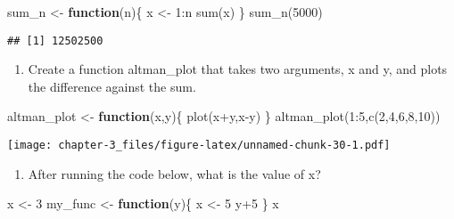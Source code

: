 \documentclass[
]{article}
\newenvironment{Shaded}{\begin{snugshade}}{\end{snugshade}}
\newcommand{\ControlFlowTok}[1]{\textcolor[rgb]{0.13,0.29,0.53}{\textbf{#1}}}
\newcommand{\DecValTok}[1]{\textcolor[rgb]{0.00,0.00,0.81}{#1}}
\newcommand{\FunctionTok}[1]{\textcolor[rgb]{0.00,0.00,0.00}{#1}}
\newcommand{\NormalTok}[1]{#1}
\newcommand{\OtherTok}[1]{\textcolor[rgb]{0.56,0.35,0.01}{#1}}
\newcommand{\SpecialCharTok}[1]{\textcolor[rgb]{0.00,0.00,0.00}{#1}}
\providecommand{\tightlist}{%
  \setlength{\itemsep}{0pt}\setlength{\parskip}{0pt}}
\begin{document}
\begin{Shaded}
\begin{Highlighting}[]
\NormalTok{sum\_n }\OtherTok{\textless{}{-}} \ControlFlowTok{function}\NormalTok{(n)\{}
\NormalTok{  x }\OtherTok{\textless{}{-}} \DecValTok{1}\SpecialCharTok{:}\NormalTok{n}
  \FunctionTok{sum}\NormalTok{(x)}
\NormalTok{\}}
\FunctionTok{sum\_n}\NormalTok{(}\DecValTok{5000}\NormalTok{)}
\end{Highlighting}
\end{Shaded}

\begin{verbatim}
## [1] 12502500
\end{verbatim}

\begin{enumerate}
\def\labelenumi{\arabic{enumi}.}
\setcounter{enumi}{4}
\tightlist
\item
  Create a function altman\_plot that takes two arguments, x and y, and
  plots the difference against the sum.
\end{enumerate}

\begin{Shaded}
\begin{Highlighting}[]
\NormalTok{altman\_plot }\OtherTok{\textless{}{-}} \ControlFlowTok{function}\NormalTok{(x,y)\{}
  \FunctionTok{plot}\NormalTok{(x}\SpecialCharTok{+}\NormalTok{y,x}\SpecialCharTok{{-}}\NormalTok{y)}
\NormalTok{\}}
\FunctionTok{altman\_plot}\NormalTok{(}\DecValTok{1}\SpecialCharTok{:}\DecValTok{5}\NormalTok{,}\FunctionTok{c}\NormalTok{(}\DecValTok{2}\NormalTok{,}\DecValTok{4}\NormalTok{,}\DecValTok{6}\NormalTok{,}\DecValTok{8}\NormalTok{,}\DecValTok{10}\NormalTok{))}
\end{Highlighting}
\end{Shaded}

\texttt{[image: chapter-3\_files/figure-latex/unnamed-chunk-30-1.pdf]}

\begin{enumerate}
\def\labelenumi{\arabic{enumi}.}
\setcounter{enumi}{5}
\tightlist
\item
  After running the code below, what is the value of x?
\end{enumerate}

\begin{Shaded}
\begin{Highlighting}[]
\NormalTok{x }\OtherTok{\textless{}{-}} \DecValTok{3}
\NormalTok{my\_func }\OtherTok{\textless{}{-}} \ControlFlowTok{function}\NormalTok{(y)\{}
\NormalTok{  x }\OtherTok{\textless{}{-}} \DecValTok{5}
\NormalTok{  y}\SpecialCharTok{+}\DecValTok{5}
\NormalTok{\}}
\NormalTok{x}
\end{Highlighting}
\end{Shaded}
\end{document}
